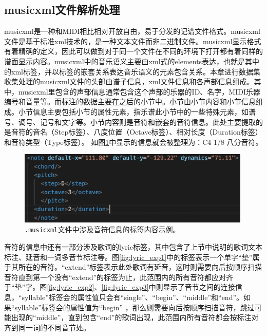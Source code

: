 \subsection{musicxml文件解析处理}
musicxml是一种和MIDI相比相对开放自由，易于分发的记谱文件格式。musicxml文件是基于标准xml技术的，是一种文本文件而非二进制文件。musicxml显示格式有着精确的定义，因此可以做到对于同一个文件在不同的环境下打开都有着同样的谱面显示内容。musicxml中的音乐语义主要由xml式的elements表达，也就是其中的xml标签，并以标签的嵌套关系表达音乐语义的元素包含关系。本章进行数据集收集处理的musicxml文件的头部由谱子信息，xml文件信息和各声部信息组成。其中，musicxml里包含的声部信息通常包含这个声部的乐器的ID、名字，MIDI乐器编号和音量等。而标注的数据主要在之后的小节中。小节由小节内容和小节信息组成。小节信息主要包括小节的属性元素，指乐谱此小节中的一些特殊元素，如谱号、调号、记号和文字等。小节内容则是音符和嵌套的音符信息。此处主要提取的是音符的音名（Step标签）、八度位置（Octave标签）、相对长度（Duration标签）和音符类型（Type标签）。
如图\ref{fig:musicxml_exp}中显示的信息就会被整理为：C4 1/8 八分音符。
\begin{figure}[ht]
    \centering
    \includegraphics[width=0.99\textwidth]{figure/ast/musicxml_exp.png}
    \caption{\texttt{.musicxml}文件中涉及音符信息的标签内容示例。}
    \label{fig:musicxml_exp}
\end{figure}
音符的信息中还有一部分涉及歌词的lyric标签，其中包含了上节中说明的歌词文本标注、延音和一词多音节标注等。图\ref{fig:lyric_exp1}中的标签表示一个单字``垫''属于其所在的音符。``extend''标签表示此处歌词有延音，这时则需要向后按顺序扫描音符直到第一个没有``extend''的标签为止，此范围内的所有音符都应对齐于``垫''字。图\ref{fig:lyric_exp2}、\ref{fig:lyric_exp3}中则显示了音节之间的连接信息，``syllable''标签会的属性值只会有``single''、``begin''、``middle''和``end''。如果``syllable''标签会的属性值为``begin''
，那么则需要向后按顺序扫描音符，跳过可能出现的``middle''，直到包含``end''的歌词出现，此范围内所有音符都会按标注对齐到同一词的不同音节处。
